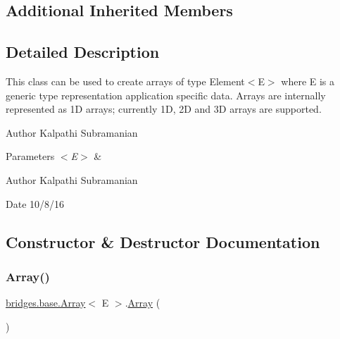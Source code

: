\subsection*{Additional Inherited Members}


\subsection{Detailed Description}
This class can be used to create arrays of type Element$<$\+E$>$ where E is a generic type representation application specific data. Arrays are internally represented as 1D arrays; currently 1D, 2D and 3D arrays are supported. 

\begin{DoxyAuthor}{Author}
Kalpathi Subramanian
\end{DoxyAuthor}

\begin{DoxyParams}{Parameters}
{\em $<$\+E$>$} & \\
\hline
\end{DoxyParams}
\begin{DoxyAuthor}{Author}
Kalpathi Subramanian 
\end{DoxyAuthor}
\begin{DoxyDate}{Date}
10/8/16 
\end{DoxyDate}


\subsection{Constructor \& Destructor Documentation}
\hypertarget{classbridges_1_1base_1_1_array_ad5dbf7bbd9811c2dac16a5c135465d4b}{}\label{classbridges_1_1base_1_1_array_ad5dbf7bbd9811c2dac16a5c135465d4b} 
\subsubsection{\texorpdfstring{Array()}{Array()}\hspace{0.1cm}{\footnotesize\ttfamily [1/2]}}
{\footnotesize\ttfamily \hyperlink{classbridges_1_1base_1_1_array}{bridges.\+base.\+Array}$<$ E $>$.\hyperlink{classbridges_1_1base_1_1_array}{Array} (\begin{DoxyParamCaption}{ }\end{DoxyParamCaption})}

\hypertarget{classbridges_1_1base_1_1_array_ab37dbe6efe0c34242456971e430763f7}{}\label{classbridges_1_1base_1_1_array_ab37dbe6efe0c34242456971e430763f7} 
